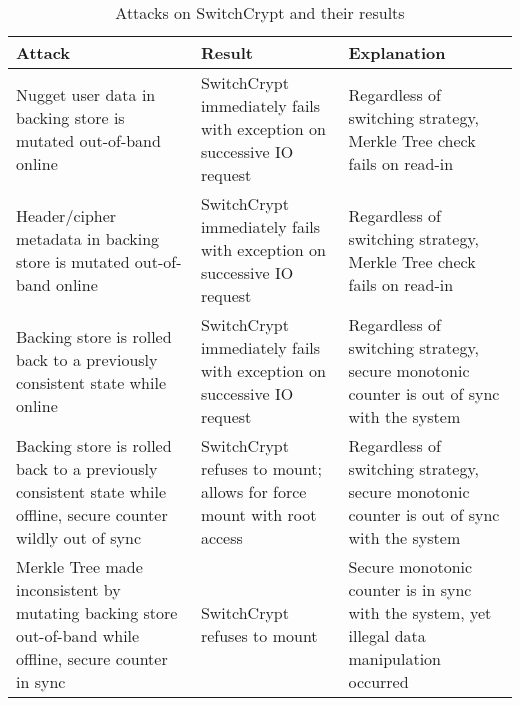 \begin{table}[t]
  \caption{Attacks on SwitchCrypt and their results}\label{tbl:security}
  \footnotesize
  \centering
  \begin{tabu} to \linewidth { | X[l] | X[c] | X[c] | }
    \hline
    \textbf{Attack} & \textbf{Result} & \textbf{Explanation} \\
    \hline\hline
    Nugget user data in backing store is mutated out-of-band online &
    SwitchCrypt immediately fails with exception on successive IO request &
    Regardless of switching strategy, Merkle Tree check fails on read-in\\
    \hline
    Header/cipher metadata in backing store is mutated out-of-band online &
    SwitchCrypt immediately fails with exception on successive IO request &
    Regardless of switching strategy, Merkle Tree check fails on read-in\\
    \hline
    Backing store is rolled back to a previously consistent state while online &
    SwitchCrypt immediately fails with exception on successive IO request &
    Regardless of switching strategy, secure monotonic counter is out of sync
    with the system\\
    \hline
    Backing store is rolled back to a previously consistent state while offline,
    secure counter wildly out of sync & SwitchCrypt refuses to mount; allows for
    force mount with root access & Regardless of switching strategy, secure
    monotonic counter is out of sync with the system\\
    \hline
    Merkle Tree made inconsistent by mutating backing store out-of-band while
    offline, secure counter in sync & SwitchCrypt refuses to mount & Secure
    monotonic counter is in sync with the system, yet illegal data manipulation
    occurred\\
    \hline\hline
  \end{tabu}
\end{table}


